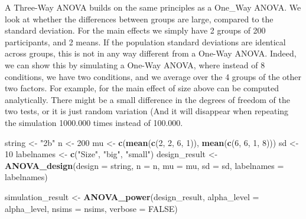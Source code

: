 \documentclass[]{book}
\newenvironment{Shaded}{\begin{snugshade}}{\end{snugshade}}
\newcommand{\DataTypeTok}[1]{\textcolor[rgb]{0.13,0.29,0.53}{#1}}
\newcommand{\DecValTok}[1]{\textcolor[rgb]{0.00,0.00,0.81}{#1}}
\newcommand{\KeywordTok}[1]{\textcolor[rgb]{0.13,0.29,0.53}{\textbf{#1}}}
\newcommand{\NormalTok}[1]{#1}
\newcommand{\OtherTok}[1]{\textcolor[rgb]{0.56,0.35,0.01}{#1}}
\newcommand{\StringTok}[1]{\textcolor[rgb]{0.31,0.60,0.02}{#1}}
\begin{document}
A Three-Way ANOVA builds on the same principles as a One\_Way ANOVA. We look at whether the differences between groups are large, compared to the standard deviation. For the main effects we simply have 2 groups of 200 participants, and 2 means. If the population standard deviations are identical across groups, this is not in any way different from a One-Way ANOVA. Indeed, we can show this by simulating a One-Way ANOVA, where instead of 8 conditions, we have two conditions, and we average over the 4 groups of the other two factors. For example, for the main effect of size above can be computed analytically. There might be a small difference in the degrees of freedom of the two tests, or it is just random variation (And it will disappear when repeating the simulation 1000.000 times instead of 100.000.

\begin{Shaded}
\begin{Highlighting}[]
\NormalTok{string <-}\StringTok{ "2b"}
\NormalTok{n <-}\StringTok{ }\DecValTok{200}
\NormalTok{mu <-}\StringTok{ }\KeywordTok{c}\NormalTok{(}\KeywordTok{mean}\NormalTok{(}\KeywordTok{c}\NormalTok{(}\DecValTok{2}\NormalTok{, }\DecValTok{2}\NormalTok{, }\DecValTok{6}\NormalTok{, }\DecValTok{1}\NormalTok{)), }\KeywordTok{mean}\NormalTok{(}\KeywordTok{c}\NormalTok{(}\DecValTok{6}\NormalTok{, }\DecValTok{6}\NormalTok{, }\DecValTok{1}\NormalTok{, }\DecValTok{8}\NormalTok{)))}
\NormalTok{sd <-}\StringTok{ }\DecValTok{10}
\NormalTok{labelnames <-}\StringTok{ }\KeywordTok{c}\NormalTok{(}\StringTok{"Size"}\NormalTok{, }\StringTok{"big"}\NormalTok{, }\StringTok{"small"}\NormalTok{)}
\NormalTok{design_result <-}\StringTok{ }\KeywordTok{ANOVA_design}\NormalTok{(}\DataTypeTok{design =}\NormalTok{ string,}
                   \DataTypeTok{n =}\NormalTok{ n, }
                   \DataTypeTok{mu =}\NormalTok{ mu, }
                   \DataTypeTok{sd =}\NormalTok{ sd, }
                   \DataTypeTok{labelnames =}\NormalTok{ labelnames)}
\end{Highlighting}
\end{Shaded}

\begin{Shaded}
\begin{Highlighting}[]
\NormalTok{simulation_result <-}\StringTok{ }\KeywordTok{ANOVA_power}\NormalTok{(design_result, }
                                 \DataTypeTok{alpha_level =}\NormalTok{ alpha_level, }
                                 \DataTypeTok{nsims =}\NormalTok{ nsims,}
                                 \DataTypeTok{verbose =} \OtherTok{FALSE}\NormalTok{)}
\end{Highlighting}
\end{Shaded}
\end{document}
